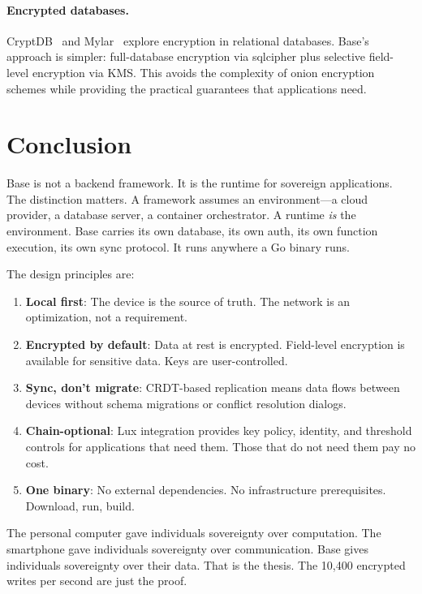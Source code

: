\documentclass[11pt]{article}
\begin{document}
\paragraph{Encrypted databases.} CryptDB~\cite{cryptdb} and
Mylar~\cite{mylar} explore encryption in relational databases.
Base's approach is simpler: full-database encryption via sqlcipher plus
selective field-level encryption via KMS. This avoids the complexity of
onion encryption schemes while providing the practical guarantees that
applications need.

\section{Conclusion}
\label{sec:conclusion}

Base is not a backend framework. It is the runtime for sovereign applications.
The distinction matters. A framework assumes an environment---a cloud provider,
a database server, a container orchestrator. A runtime \emph{is} the
environment. Base carries its own database, its own auth, its own function
execution, its own sync protocol. It runs anywhere a Go binary runs.

The design principles are:

\begin{enumerate}[leftmargin=1.4em]
    \item \textbf{Local first}: The device is the source of truth. The network
    is an optimization, not a requirement.
    \item \textbf{Encrypted by default}: Data at rest is encrypted. Field-level
    encryption is available for sensitive data. Keys are user-controlled.
    \item \textbf{Sync, don't migrate}: CRDT-based replication means data flows
    between devices without schema migrations or conflict resolution dialogs.
    \item \textbf{Chain-optional}: Lux integration provides key policy,
    identity, and threshold controls for applications that need them. Those
    that do not need them pay no cost.
    \item \textbf{One binary}: No external dependencies. No infrastructure
    prerequisites. Download, run, build.
\end{enumerate}

The personal computer gave individuals sovereignty over computation. The
smartphone gave individuals sovereignty over communication. Base gives
individuals sovereignty over their data. That is the thesis. The 10,400
encrypted writes per second are just the proof.
\end{document}
